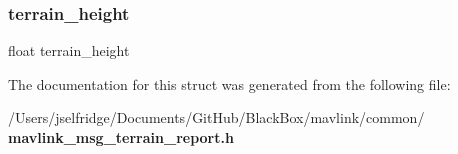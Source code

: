 \mbox{\label{struct____mavlink__terrain__report__t_a97a44ed0eb3f1add658bda60c1e049dc}} 
\subsubsection{terrain\+\_\+height}
{\footnotesize\ttfamily float terrain\+\_\+height}



The documentation for this struct was generated from the following file\+:\begin{DoxyCompactItemize}
\item 
/\+Users/jselfridge/\+Documents/\+Git\+Hub/\+Black\+Box/mavlink/common/\textbf{ mavlink\+\_\+msg\+\_\+terrain\+\_\+report.\+h}\end{DoxyCompactItemize}
